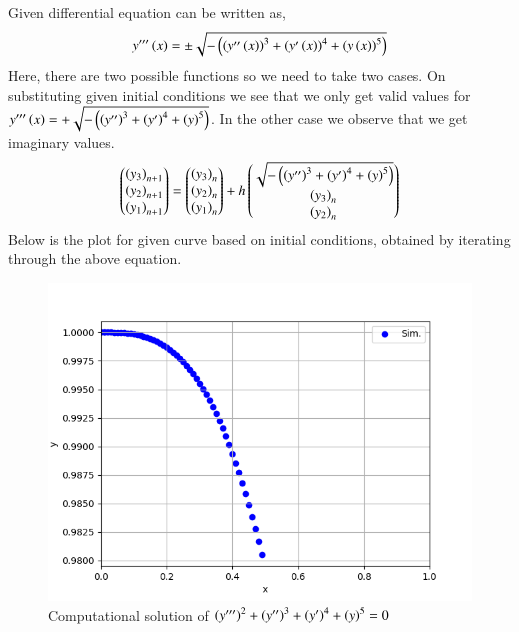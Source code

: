\documentclass[journal]{IEEEtran}
\begin{document}
Given differential equation can be written as,
\begin{align}
    y^{\prime \prime \prime}\left(x\right) = \pm \sqrt{-\left(\left(y^{\prime \prime}\left(x\right)\right)^3 + \left(y^{\prime}\left(x\right)\right)^4 + \left(y\left(x\right)\right)^5 \right)}
\end{align}
Here, there are two possible functions so we need to take two cases. On substituting given initial conditions we see that we only get valid values for $y^{\prime \prime \prime}\left(x\right) = + \sqrt{-\left(\left(y^{\prime \prime}\right)^3 + \left(y^{\prime}\right)^4 + \left(y\right)^5 \right)}$. In the other case we observe that we get imaginary values.
\begin{align}
    \begin{pmatrix}\left(y_{3}\right)_{n+1} \\ \left(y_{2}\right)_{n+1} \\ \left(y_1\right)_{n+1}\end{pmatrix}=\begin{pmatrix}\left(y_{3}\right)_n \\ \left(y_2\right)_n \\ \left(y_1\right)_n\end{pmatrix}+h\begin{pmatrix}\sqrt{-\left(\left(y^{\prime \prime}\right)^3 + \left(y^{\prime}\right)^4 + \left(y\right)^5 \right)}\\ \left(y_3\right)_n \\ \left(y_2\right)_n\end{pmatrix}
\end{align}
Below is the plot for given curve  based on initial conditions, obtained by iterating through the above equation.
\begin{figure}[h!]
   \centering
   \includegraphics[width=1\columnwidth]{figs/fig1.png}
   \caption{Computational solution of $\left(y^{\prime \prime \prime}\right)^2 + \left(y^{\prime \prime}\right)^3 + \left(y^{\prime}\right)^4 + \left(y\right)^5 = 0$}
   \label{stemplot}
\end{figure}
\end{document}
